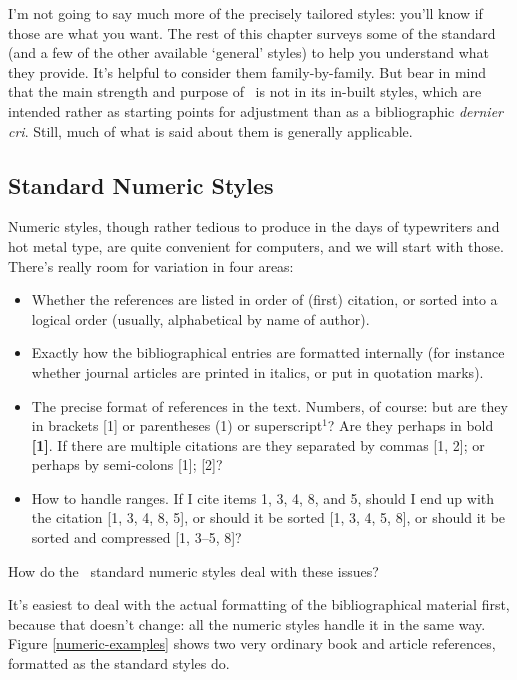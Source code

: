 I'm not going to say much more of the precisely tailored styles:
you'll know if those are what you want. The rest of this chapter
surveys some of the standard (and a few of the other available
`general' styles) to help you understand what they provide. It's
helpful to consider them family-by-family. But bear in mind that
the main strength and purpose of \biblatex\ is not in its in-built
styles, which are intended rather as starting points for adjustment
than as a bibliographic \emph{dernier cri}. Still, much of what is
said about them is generally applicable.

\subsection{Standard Numeric Styles}

Numeric styles, though rather tedious to produce in the days of
typewriters and hot metal type, are quite convenient for computers,
and we will start with those. There's really room for variation in
four areas:
\begin{itemize}
\item Whether the references are listed in order of (first) citation,
  or sorted into a logical order (usually, alphabetical by name of
  author).
\item Exactly how the bibliographical entries are formatted internally
  (for instance whether journal articles are printed in italics, or
  put in quotation marks).
\item The precise format of references in the text. Numbers, of
  course: but are they in brackets [1] or parentheses (1) or
  superscript$^{1}$? Are they perhaps in bold \textbf{[1]}. If there
  are multiple citations are they separated by commas [1, 2]; or
  perhaps by semi-colons [1]; [2]?
\item How to handle ranges. If I cite items 1, 3, 4, 8, and 5, should
  I end up with the citation [1, 3, 4, 8, 5], or should it be sorted
  [1, 3, 4, 5, 8], or should it be sorted and compressed [1, 3--5, 8]?
\end{itemize}

How do the \biblatex\ standard numeric styles deal with these issues?

It's easiest to deal with the actual formatting of the bibliographical
material first, because that doesn't change: all the numeric styles handle it
in the same way. Figure \ref{numeric-examples} shows two very ordinary
book and article references, formatted as the standard styles do.

